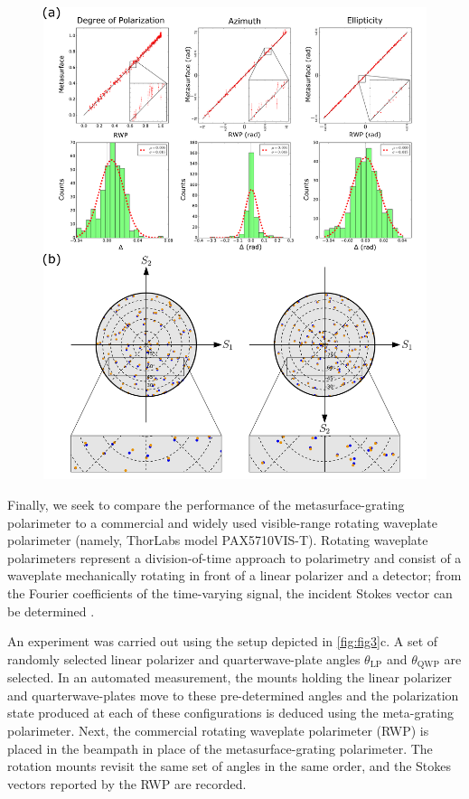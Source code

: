\documentclass[footinbib,aps,prl,twocolumn,superscriptaddress]{revtex4-1}
\begin{document}
\begin{figure}[!htp]
	\centering
	\includegraphics[width=\linewidth]{Fig4.pdf}
	\caption{\label{fig:fig4}}
\end{figure}

Finally, we seek to compare the performance of the metasurface-grating polarimeter to a commercial and widely used visible-range rotating waveplate polarimeter (namely, ThorLabs model PAX5710VIS-T). Rotating waveplate polarimeters represent a division-of-time approach to polarimetry and consist of a waveplate mechanically rotating in front of a linear polarizer and a detector; from the Fourier coefficients of the time-varying signal, the incident Stokes vector can be determined \cite{Berry1977, Azzam2016}.

An experiment was carried out using the setup depicted in \ref{fig:fig3}c. A set of randomly selected linear polarizer and quarterwave-plate angles ${\theta_{\text{LP}}}$ and ${\theta_{\text{QWP}}}$ are selected. In an automated measurement, the mounts holding the linear polarizer and quarterwave-plates move to these pre-determined angles and the polarization state produced at each of these configurations is deduced using the meta-grating polarimeter. Next, the commercial rotating waveplate polarimeter (RWP) is placed in the beampath in place of the metasurface-grating polarimeter. The rotation mounts revisit the same set of angles in the same order, and the Stokes vectors reported by the RWP are recorded.
\end{document}
